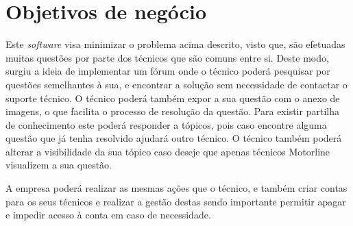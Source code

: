 \section{Objetivos de negócio}

Este \textit{software} visa minimizar o problema acima descrito, visto que, são efetuadas muitas questões por parte dos técnicos que são comuns entre si. Deste modo, surgiu a ideia de implementar um fórum onde o técnico poderá pesquisar por questões semelhantes à sua, e encontrar a solução sem necessidade de contactar o suporte técnico. O técnico poderá também expor a sua questão com o anexo de imagens, o que facilita o processo de resolução da questão. Para existir partilha de conhecimento este poderá responder a tópicos, pois caso encontre alguma questão que já tenha resolvido ajudará outro técnico. O técnico também poderá alterar a visibilidade da sua tópico caso deseje que apenas técnicos Motorline visualizem a sua questão.

A empresa poderá realizar as mesmas ações que o técnico, e também criar contas para os seus técnicos e realizar a gestão destas sendo importante permitir apagar e impedir acesso à conta em caso de necessidade.
